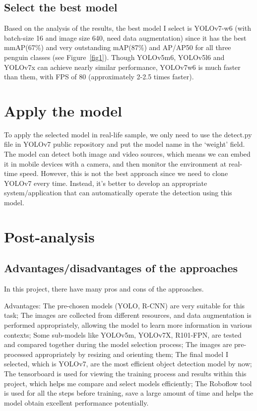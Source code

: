 \documentclass[runningheads]{llncs}
\begin{document}
\subsection{Select the best model}
Based on the analysis of the results, the best model I select is YOLOv7-w6 (with batch-size 16 and image size 640, need data augmentation) since it has the best mmAP(67\%) and very outstanding mAP(87\%) and AP/AP50 for all three penguin classes (see Figure~\ref{fig1}). Though YOLOv5m6, YOLOv5l6 and YOLOv7x can achieve nearly similar performance, YOLOv7w6 is much faster than them, with FPS of 80 (approximately 2-2.5 times faster).

\section{Apply the model}
To apply the selected model in real-life sample, we only need to use the detect.py file in YOLOv7 public repository and put the model name in the `weight' field. The model can detect both image and video sources, which means we can embed it in mobile devices with a camera, and then monitor the environment at real-time speed. However, this is not the best approach since we need to clone YOLOv7 every time. Instead, it's better to develop an appropriate system/application that can automatically operate the detection using this model.

\section{Post-analysis}
\subsection{Advantages/disadvantages of the approaches}
In this project, there have many pros and cons of the approaches.

Advantages: The pre-chosen models (YOLO, R-CNN) are very suitable for this task; The images are collected from different resources, and data augmentation is performed appropriately, allowing the model to learn more information in various contexts; Some sub-models like YOLOv5m, YOLOv7X, R101-FPN, are tested and compared together during the model selection process; The images are pre-processed appropriately by resizing and orienting them; The final model I selected, which is YOLOv7, are the most efficient object detection model by now; The tensorboard is used for viewing the training process and results within this project, which helps me compare and select models efficiently; The Roboflow tool is used for all the steps before training, save a large amount of time and helps the model obtain excellent performance potentially. 
\end{document}

